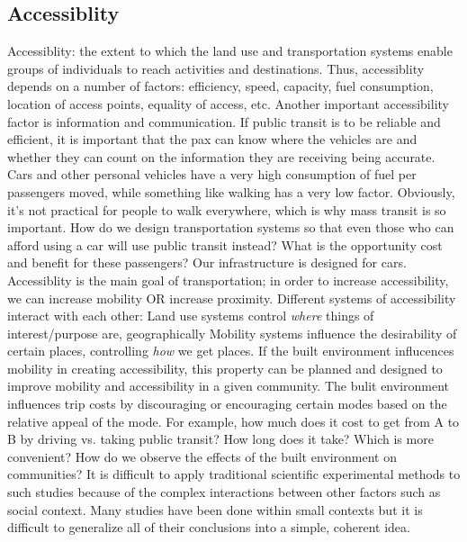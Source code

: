 \documentclass{article}
\begin{document}
    \subsection{Accessiblity}
    \begin{outline}
        \1 Accessiblity: the extent to which the land use and transportation systems enable groups of individuals to reach activities and destinations. 
        \1 Thus, accessiblity depends on a number of factors: efficiency, speed, capacity, fuel consumption, location of access points, equality of access, etc. 
        \1 Another important accessibility factor is information and communication. If public transit is to be reliable and efficient, it is important that the pax can know where the vehicles are and whether they can count on the information they are receiving being accurate. 
        \1 Cars and other personal vehicles have a very high consumption of fuel per passengers moved, while something like walking has a very low factor. Obviously, it's not practical for people to walk everywhere, which is why mass transit is so important. 
        \1 How do we design transportation systems so that even those who can afford using a car will use public transit instead? What is the opportunity cost and benefit for these passengers?
        \1 Our infrastructure is designed for cars. 
        \1 Accessiblity is the main goal of transportation; in order to increase accessibility, we can increase mobility OR increase proximity. 
        \1 Different systems of accessibility interact with each other:    
            \2 Land use systems control \textit{where} things of interest/purpose are, geographically
            \2 Mobility systems influence the desirability of certain places, controlling \textit{how} we get places. 
        \1 If the built environment influcences mobility in creating accessibility, this property can be planned and designed to improve mobility and accessibility in a given community. 
        \1 The bulit environment influences trip costs by discouraging or encouraging certain modes based on the relative appeal of the mode. For example, how much does it cost to get from A to B by driving vs. taking public transit? How long does it take? Which is more convenient?
        \1 How do we observe the effects of the built environment on communities? 
            \2 It is difficult to apply traditional scientific experimental methods to such studies because of the complex interactions between other factors such as social context. 
            \2 Many studies have been done within small contexts but it is difficult to generalize all of their conclusions into a simple, coherent idea. 
    \end{outline}
\end{document}
